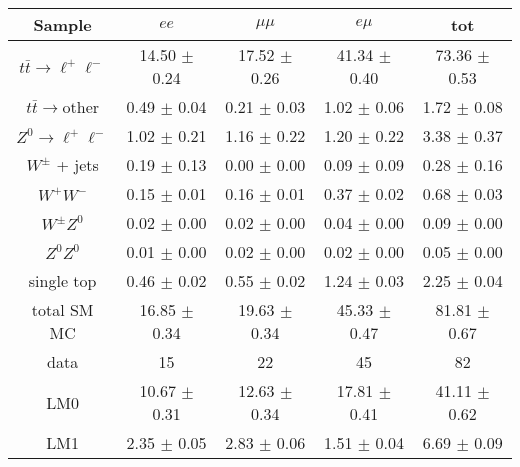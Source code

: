 \begin{table}[htb]
\begin{center}
\begin{tabular}{ccccc}
\hline
              Sample                     &                $ee$   &            $\mu\mu$   &              $e\mu$   &                 tot  \\
\hline
$t\bar{t}\rightarrow \ell^{+}\ell^{-}$   &    14.50 $\pm$ 0.24   &    17.52 $\pm$ 0.26   &    41.34 $\pm$ 0.40   &    73.36 $\pm$ 0.53  \\
$t\bar{t}\rightarrow \mathrm{other}$     &     0.49 $\pm$ 0.04   &     0.21 $\pm$ 0.03   &     1.02 $\pm$ 0.06   &     1.72 $\pm$ 0.08  \\
$Z^0 \rightarrow \ell^{+}\ell^{-}$       &     1.02 $\pm$ 0.21   &     1.16 $\pm$ 0.22   &     1.20 $\pm$ 0.22   &     3.38 $\pm$ 0.37  \\
    $W^{\pm}$ + jets                     &     0.19 $\pm$ 0.13   &     0.00 $\pm$ 0.00   &     0.09 $\pm$ 0.09   &     0.28 $\pm$ 0.16  \\
            $W^+W^-$                     &     0.15 $\pm$ 0.01   &     0.16 $\pm$ 0.01   &     0.37 $\pm$ 0.02   &     0.68 $\pm$ 0.03  \\
        $W^{\pm}Z^0$                     &     0.02 $\pm$ 0.00   &     0.02 $\pm$ 0.00   &     0.04 $\pm$ 0.00   &     0.09 $\pm$ 0.00  \\
            $Z^0Z^0$                     &     0.01 $\pm$ 0.00   &     0.02 $\pm$ 0.00   &     0.02 $\pm$ 0.00   &     0.05 $\pm$ 0.00  \\
          single top                     &     0.46 $\pm$ 0.02   &     0.55 $\pm$ 0.02   &     1.24 $\pm$ 0.03   &     2.25 $\pm$ 0.04  \\
\hline
         total SM MC                     &    16.85 $\pm$ 0.34   &    19.63 $\pm$ 0.34   &    45.33 $\pm$ 0.47   &    81.81 $\pm$ 0.67  \\
\hline
                data                     &                  15   &                  22   &                  45   &                  82  \\
\hline
                 LM0                     &    10.67 $\pm$ 0.31   &    12.63 $\pm$ 0.34   &    17.81 $\pm$ 0.41   &    41.11 $\pm$ 0.62  \\
                 LM1                     &     2.35 $\pm$ 0.05   &     2.83 $\pm$ 0.06   &     1.51 $\pm$ 0.04   &     6.69 $\pm$ 0.09  \\

\hline
\end{tabular}
\end{center}
\end{table}
